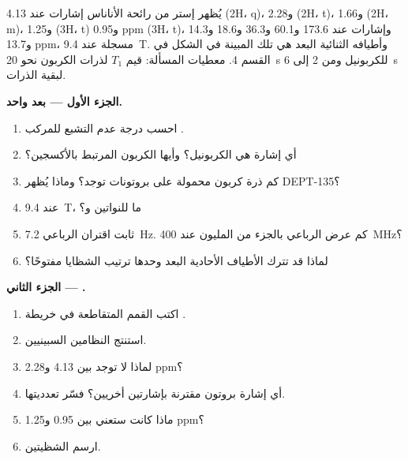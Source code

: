 \begin{problem}
\label{pb:b3:advanced-nmr:1}
يُظهر إستر  من رائحة الأناناس إشارات  عند 4.13 (2H،
q)، و2.28 (2H، t)، و1.66 (2H، m)، و1.25 (3H، t) و0.95 ppm (3H، t)، وإشارات 
عند 173.6 و60.1 و36.3 و18.6 و14.3 و13.7 ppm، مسجلة عند \qty{9.4}{T}. وأطيافه الثنائية
البعد هي تلك المبينة في الشكل في القسم 4. معطيات المسألة: قيم $T_1$
لذرات الكربون نحو \qty{20}{s} للكربونيل ومن 2 إلى \qty{6}{s} لبقية
الذرات.

\medskip\noindent\textbf{الجزء الأول --- بعد واحد.}
\begin{enumerate}
  \item احسب درجة عدم التشبع للمركب .
  \item أي إشارة  هي الكربونيل؟ وأيها الكربون المرتبط بالأكسجين؟
  \item كم ذرة كربون محمولة على بروتونات توجد؟ وماذا يُظهر DEPT-135؟
  \item عند \qty{9.4}{T}، ما  للنواتين  و؟
  \item ثابت اقتران الرباعي \qty{7.2}{Hz}. كم عرض الرباعي بالجزء من المليون
        عند \qty{400}{MHz}؟
  \item لماذا قد تترك الأطياف الأحادية البعد وحدها ترتيب الشظايا مفتوحًا؟
\end{enumerate}

\medskip\noindent\textbf{الجزء الثاني --- .}
\begin{enumerate}[resume]
  \item اكتب القمم المتقاطعة في خريطة .
  \item استنتج النظامين السبينيين.
  \item لماذا لا توجد  بين 4.13 و2.28 ppm؟
  \item أي إشارة بروتون مقترنة بإشارتين أخريين؟ فسّر تعدديتها.
  \item ماذا كانت ستعني  بين 0.95 و1.25 ppm؟
  \item ارسم الشظيتين.
\end{enumerate}


\end{problem}
